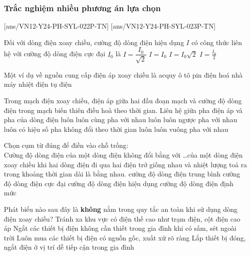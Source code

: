\subsubsection{Trắc nghiệm nhiều phương án lựa chọn}
\setcounter{ex}{0}
[ans/VN12-Y24-PH-SYL-022P-TN]
[ans/VN12-Y24-PH-SYL-023P-TN]
\begin{ex}
	Đối với dòng điện xoay chiều, cường độ dòng điện hiệu dụng $I$ có công thức liên hệ với cường độ dòng điện cực đại $I_0$ là
	\choice
	{\True $I=\dfrac{I_0}{\sqrt{2}}$}
	{$I=I_0$}
	{$I=I_0 \sqrt{2}$}
	{$I=\frac{I_0}{2}$}
	\loigiai{}
\end{ex}
\begin{ex}
	Một ví dụ về nguồn cung cấp điện áp xoay chiều là
	\choice
	{acquy ô tô}
	{pin điện hoá}
	{\True nhà máy nhiệt điện}
	{tụ điện}
	\loigiai{}
\end{ex}
\begin{ex}
	Trong mạch điện xoay chiều, điện áp giữa hai đầu đoạn mạch và cường độ dòng điện trong mạch biến thiên điều hoà theo thời gian. Liên hệ giữa pha điện áp và pha của dòng điện	
	\choice
	{luôn luôn cùng pha với nhau}
	{luôn luôn ngược pha với nhau}
	{\True luôn có hiệu số pha không đổi theo thời gian}
	{luôn luôn vuông pha với nhau}
	\loigiai{}
\end{ex}
\begin{ex}
	Chọn cụm từ đúng để điền vào chỗ trống: \\Cường độ dòng điện của một dòng điện không đổi bằng với \dots của một dòng điện xoay chiều khi hai dòng điện đi qua hai điện trở giống nhau và nhiệt lượng toả ra trong khoảng thời gian dài là bằng nhau.
	\choice
	{cường độ dòng điện trung bình}
	{cường độ dòng điện cực đại}
	{\True cường độ dòng điện hiệu dụng}
	{cường độ dòng điện định mức}
	\loigiai{}
\end{ex}
\begin{ex}
	Phát biểu nào sau đây là \textbf{không} nằm trong quy tắc an toàn khi sử dụng dòng điện xoay chiều?
	\choice
	{Tránh xa khu vực có điện thế cao như trạm điện, cột điện cao áp}
	{Ngắt các thiết bị điện không cần thiết trong gia đình khi có sấm, sét ngoài trời}
	{\True Luôn mua các thiết bị điện có nguồn gốc, xuất xứ rõ ràng}
	{Lắp thiết bị đóng, ngắt điện ở vị trí dễ tiếp cận trong gia đình}
	\loigiai{}
\end{ex}


